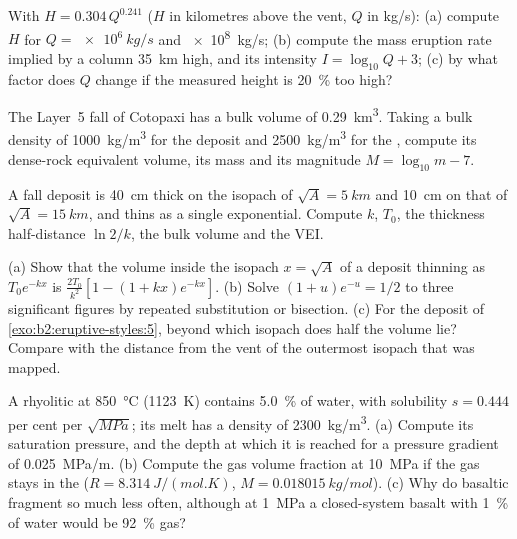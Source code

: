\begin{exercise}[$\star$]\label{exo:b2:eruptive-styles:3}
With $H = 0.304\,Q^{0.241}$ ($H$ in kilometres above the vent, $Q$ in
\unit{kg/s}): (a) compute $H$ for $Q = \qty{e6}{kg/s}$ and \qty{e8}{kg/s};
(b) compute the mass eruption rate implied by a column \qty{35}{km} high, and its
intensity $I = \log_{10}Q + 3$; (c) by what factor does $Q$ change if the measured
height is \qty{20}{\percent} too high?
\end{exercise}

\begin{exercise}[$\star$]\label{exo:b2:eruptive-styles:4}
The Layer~5 fall of Cotopaxi has a bulk volume of \qty{0.29}{km^3}. Taking a
bulk density of \qty{1000}{kg/m^3} for the deposit and \qty{2500}{kg/m^3} for the
, compute its dense-rock equivalent volume, its mass and its magnitude
$M = \log_{10}m - 7$.
\end{exercise}

\begin{exercise}[$\star\star$]\label{exo:b2:eruptive-styles:5}
A fall deposit is \qty{40}{cm} thick on the isopach of $\sqrt A = \qty{5}{km}$
and \qty{10}{cm} on that of $\sqrt A = \qty{15}{km}$, and thins as a single
exponential. Compute $k$, $T_0$, the thickness half-distance $\ln 2/k$, the bulk
volume and the VEI.
\end{exercise}

\begin{exercise}[$\star\star$]\label{exo:b2:eruptive-styles:6}
(a) Show that the volume inside the isopach $x = \sqrt A$ of a deposit thinning
as $T_0e^{-kx}$ is $\frac{2T_0}{k^2}[1 - (1 + kx)e^{-kx}]$. (b) Solve $(1 + u)e^{-u} =
1/2$ to three significant figures by repeated substitution or bisection. (c) For
the deposit of \cref{exo:b2:eruptive-styles:5}, beyond which isopach does half the volume lie? Compare
with the distance from the vent of the outermost isopach that was mapped.
\end{exercise}

\begin{exercise}[$\star\star$]\label{exo:b2:eruptive-styles:7}
A rhyolitic  at \qty{850}{\celsius} (\qty{1123}{K}) contains
\qty{5.0}{\percent} of water, with solubility $s = 0.444$ per cent per
$\sqrt{\unit{MPa}}$; its melt has a density of \qty{2300}{kg/m^3}. (a) Compute its
saturation pressure, and the depth at which it is reached for a pressure
gradient of \qty{0.025}{MPa/m}. (b) Compute the gas volume fraction at
\qty{10}{MPa} if the gas stays in the  ($R = \qty{8.314}{J/(mol.K)}$, $M =
\qty{0.018015}{kg/mol}$). (c) Why do basaltic  fragment so much less
often, although at \qty{1}{MPa} a closed-system basalt with \qty{1}{\percent} of
water would be \qty{92}{\percent} gas?
\end{exercise}

